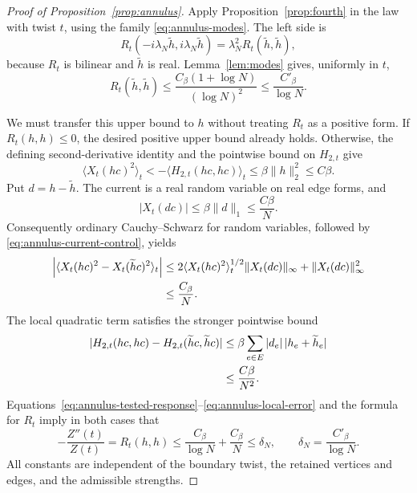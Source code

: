 \begin{proof}[Proof of Proposition~\ref{prop:annulus}]
Apply Proposition~\ref{prop:fourth} in the law with twist $t$, using
the family \eqref{eq:annulus-modes}.  The left side is
\[
 R_t(-i\lambda_N\widetilde h,i\lambda_N\widetilde h)
 =\lambda_N^2R_t(\widetilde h,\widetilde h),
\]
because $R_t$ is bilinear and $\widetilde h$ is real.
Lemma~\ref{lem:modes} gives, uniformly in $t$,
\begin{equation}\label{eq:annulus-tested-response}
 R_t(\widetilde h,\widetilde h)
 \leq\frac{C_\beta(1+\log N)}{(\log N)^2}
 \leq\frac{C'_\beta}{\log N}.
\end{equation}

We must transfer this upper bound to $h$ without treating $R_t$ as a
positive form.  If $R_t(h,h)\leq0$, the desired positive upper bound
already holds.  Otherwise, the defining second-derivative identity
and the pointwise bound on $H_{2,t}$ give
\begin{equation}\label{eq:annulus-current-control}
 \langle X_t(hc)^2\rangle_t
 <-\langle H_{2,t}(hc,hc)\rangle_t
 \leq\beta\|h\|_2^2\leq C\beta.
\end{equation}
Put $d=h-\widetilde h$.  The current is a real random variable on
real edge forms, and
\[
 |X_t(dc)|\leq\beta\|d\|_1\leq\frac{C\beta}{N}.
\]
Consequently ordinary Cauchy--Schwarz for random variables, followed
by \eqref{eq:annulus-current-control}, yields
\begin{align}\label{eq:annulus-current-error}
 \left|\langle X_t(hc)^2-X_t(\widetilde h c)^2\rangle_t\right|
 &\leq
 2\langle X_t(hc)^2\rangle_t^{1/2}
       \|X_t(dc)\|_\infty+\|X_t(dc)\|_\infty^2\notag\\
 &\leq\frac{C_\beta}{N}.
\end{align}
The local quadratic term satisfies the stronger pointwise bound
\begin{align}\label{eq:annulus-local-error}
 |H_{2,t}(hc,hc)-H_{2,t}(\widetilde h c,\widetilde h c)|
 &\leq\beta\sum_{e\in E}|d_e|\,|h_e+\widetilde h_e|\notag\\
 &\leq\frac{C\beta}{N^2}.
\end{align}
Equations~\eqref{eq:annulus-tested-response}--\eqref{eq:annulus-local-error}
and the formula for $R_t$ imply in both cases that
\begin{equation}\label{eq:annulus-ode}
 -\frac{Z''(t)}{Z(t)}=R_t(h,h)
 \leq\frac{C_\beta}{\log N}+\frac{C_\beta}{N}
 \leq\delta_N,\qquad
 \delta_N=\frac{C'_\beta}{\log N}.
\end{equation}
All constants are independent of the boundary twist, the retained
vertices and edges, and the admissible strengths.


\end{proof}
